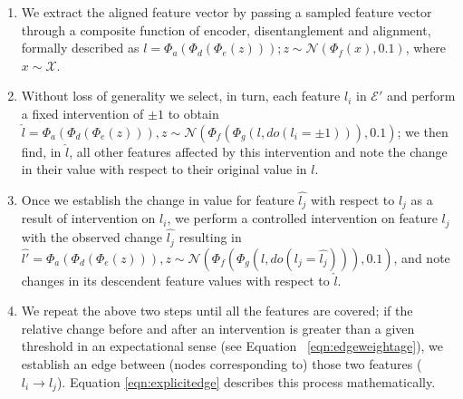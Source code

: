 \documentclass{article}
\begin{document}
\begin{enumerate}
    \item We extract the aligned feature vector by passing a sampled feature vector through a composite function of encoder, disentanglement and alignment, formally described as $l = \Phi_a (\Phi_d ( \Phi_e (z))); z \sim \mathcal{N}(\Phi_f (%
    x), 0.1)$, where $%
    x\sim \mathcal{X}$.
    \item Without loss of generality we select, in turn, each feature $l_i$ in $\mathcal{E}'$ and perform a fixed intervention of $\pm 1$ 
    to obtain $\hat{l} = \Phi_a(\Phi_d (\Phi_e(z))), z \sim \mathcal{N}(\Phi_f (\Phi_g (l, do(l_i = \pm1))), 0.1)$; we then find, in $\hat{l}$, all other features affected by this intervention and note the change in their value with respect to their original value in $l$.
    \item Once we establish the change in value for feature $\hat{l_j}$ with respect to $l_j$ as a result of intervention on $l_i$, we perform a controlled intervention on feature $l_j$ with the observed change $\hat{l_j}$ resulting in $\hat{l'} = \Phi_a(\Phi_d (\Phi_e(z))), z \sim \mathcal{N}(\Phi_f (\Phi_g (l, do(l_j = \hat{l_j}))), 0.1)$, and note changes in its descendent feature values with respect to $\hat{l}$.
    \item We repeat the above two steps until all the features are  covered; if the relative change before and after an intervention is greater than a given threshold in an expectational sense (see  Equation ~\ref{eqn:edgeweightage}), we establish an edge between (nodes corresponding to) those two features ($l_i \rightarrow l_j$). Equation \ref{eqn:explicitedge} describes this process mathematically.
\end{enumerate}

\end{document}
